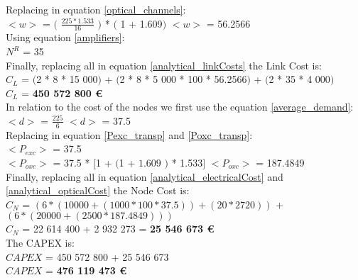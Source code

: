 Replacing in equation \ref{optical_channels}:\\

$<w>$ = $($ $\frac{225 * 1.533}{16}$ $)$ * $($ 1 + 1.609$)$ \qquad \qquad $<w>$ = 56.2566\\

Using equation \ref{amplifiers}:\\

$N^R$ = 35\\

Finally, replacing all in equation \ref{analytical_linkCosts} the Link Cost is:\\

$C_L$ = $($2 * 8 * 15 000$)$ + $($2 * 8 * 5 000 * 100 * 56.2566$)$ + $($2 * 35 * 4 000$)$\\

$C_L$ = \textbf{450 572 800 \euro}\\

In relation to the cost of the nodes we first use the equation \ref{average_demand}:\\

$<d>$ = $\frac{225}{6}$ \qquad \qquad $<d>$ = 37.5\\

Replacing in equation \ref{Pexc_transp} and \ref{Poxc_transp}:\\

$<P_{exc}>$ = 37.5\\

$<P_{oxc}>$ = 37.5 * $[$1 + $($1 + $1.609$ $)$ * 1.533$]$ \qquad \quad $<P_{oxc}>$ = 187.4849 \\

Finally, replacing all in equation \ref{analytical_electricalCost} and \ref{analytical_opticalCost} the Node Cost is:\\

$C_N$ = $\left(6 * (10 000 + (1 000 * 100 * 37.5)) + (20 * 2 720)\right)$ + $\left(6 * (20 000 + (2 500 * 187.4849)) \right)$\\

$C_N$ = 22 614 400 + 2 932 273 = \textbf{25 546 673 \euro}\\

The CAPEX is:\\
$CAPEX$ = 450 572 800 + 25 546 673\\

$CAPEX$ = \textbf{476 119 473 \euro}\\

